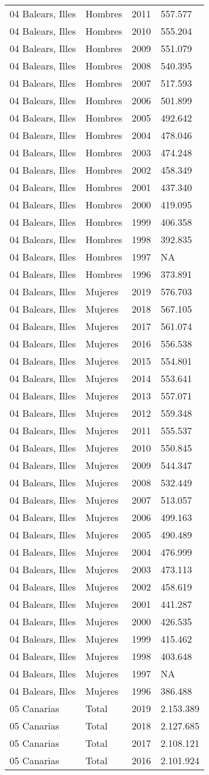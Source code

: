 \documentclass[
]{article}
\begin{document}
\begin{longtable}[]{@{}llrl@{}}
04 Balears, Illes & Hombres & 2011 & 557.577\tabularnewline
04 Balears, Illes & Hombres & 2010 & 555.204\tabularnewline
04 Balears, Illes & Hombres & 2009 & 551.079\tabularnewline
04 Balears, Illes & Hombres & 2008 & 540.395\tabularnewline
04 Balears, Illes & Hombres & 2007 & 517.593\tabularnewline
04 Balears, Illes & Hombres & 2006 & 501.899\tabularnewline
04 Balears, Illes & Hombres & 2005 & 492.642\tabularnewline
04 Balears, Illes & Hombres & 2004 & 478.046\tabularnewline
04 Balears, Illes & Hombres & 2003 & 474.248\tabularnewline
04 Balears, Illes & Hombres & 2002 & 458.349\tabularnewline
04 Balears, Illes & Hombres & 2001 & 437.340\tabularnewline
04 Balears, Illes & Hombres & 2000 & 419.095\tabularnewline
04 Balears, Illes & Hombres & 1999 & 406.358\tabularnewline
04 Balears, Illes & Hombres & 1998 & 392.835\tabularnewline
04 Balears, Illes & Hombres & 1997 & NA\tabularnewline
04 Balears, Illes & Hombres & 1996 & 373.891\tabularnewline
04 Balears, Illes & Mujeres & 2019 & 576.703\tabularnewline
04 Balears, Illes & Mujeres & 2018 & 567.105\tabularnewline
04 Balears, Illes & Mujeres & 2017 & 561.074\tabularnewline
04 Balears, Illes & Mujeres & 2016 & 556.538\tabularnewline
04 Balears, Illes & Mujeres & 2015 & 554.801\tabularnewline
04 Balears, Illes & Mujeres & 2014 & 553.641\tabularnewline
04 Balears, Illes & Mujeres & 2013 & 557.071\tabularnewline
04 Balears, Illes & Mujeres & 2012 & 559.348\tabularnewline
04 Balears, Illes & Mujeres & 2011 & 555.537\tabularnewline
04 Balears, Illes & Mujeres & 2010 & 550.845\tabularnewline
04 Balears, Illes & Mujeres & 2009 & 544.347\tabularnewline
04 Balears, Illes & Mujeres & 2008 & 532.449\tabularnewline
04 Balears, Illes & Mujeres & 2007 & 513.057\tabularnewline
04 Balears, Illes & Mujeres & 2006 & 499.163\tabularnewline
04 Balears, Illes & Mujeres & 2005 & 490.489\tabularnewline
04 Balears, Illes & Mujeres & 2004 & 476.999\tabularnewline
04 Balears, Illes & Mujeres & 2003 & 473.113\tabularnewline
04 Balears, Illes & Mujeres & 2002 & 458.619\tabularnewline
04 Balears, Illes & Mujeres & 2001 & 441.287\tabularnewline
04 Balears, Illes & Mujeres & 2000 & 426.535\tabularnewline
04 Balears, Illes & Mujeres & 1999 & 415.462\tabularnewline
04 Balears, Illes & Mujeres & 1998 & 403.648\tabularnewline
04 Balears, Illes & Mujeres & 1997 & NA\tabularnewline
04 Balears, Illes & Mujeres & 1996 & 386.488\tabularnewline
05 Canarias & Total & 2019 & 2.153.389\tabularnewline
05 Canarias & Total & 2018 & 2.127.685\tabularnewline
05 Canarias & Total & 2017 & 2.108.121\tabularnewline
05 Canarias & Total & 2016 & 2.101.924\tabularnewline

\end{longtable}
\end{document}

